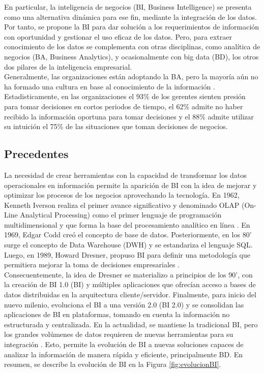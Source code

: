 \documentclass[12pt,jou]{apa7}
\begin{document}
En particular, la inteligencia de negocios (BI, Business Intelligence) se presenta como una alternativa dinámica para ese fin, mediante la integración de los datos. Por tanto, se propone la BI para dar solución a los requerimientos de información con oportunidad y gestionar el uso eficaz de los datos. Pero, para extraer conocimiento de los datos se complementa con otras disciplinas, como analítica de negocios (BA, Business Analytics), y ocasionalmente con big data (BD), los otros dos pilares de la inteligencia empresarial.\\

Generalmente, las organizaciones están adoptando la BA, pero la mayoría aún no ha formado una cultura en base al conocimiento de la información \cite{ThomasBean}. Estadisticamente, en las organizaciones el 93\% de los gerentes sienten presión para tomar decisiones en cortos periodos de tiempo, el 62\% admite no haber recibido la información oportuna para tomar decisiones y el 88\% admite utilizar su intuición el 75\% de las situaciones que toman decisiones de negocios.

\subsection{Precedentes}
La necesidad de crear herramientas con la capacidad de transformar los datos operacionales en información permite la aparición de BI con la idea de mejorar y optimizar los procesos de los negocios aprovechando la tecnología. En 1962, Kenneth Iverson realiza el primer avance significativo y denominado OLAP (On-Line Analytical Processing) como el primer lenguaje de programación multidimensional y que forma la base del procesamiento analítico en línea \cite{timem}. En 1969, Edgar Codd creó el concepto de base de datos. Posteriormente, en los 80' surge el concepto de Data Warehouse (DWH) y se estandariza el lenguaje SQL. Luego, en 1989, Howard Dresner, propuso BI para definir una metodología que permitiera mejorar la toma de decisiones empresariales \cite{direc}.\\

Consecuentemente, la idea de Dresner se materializo a principios de los 90', con la creación de BI 1.0 (BI) y múltiples aplicaciones que ofrecían acceso a bases de datos distribuidas en la arquitectura cliente/servidor. Finalmente, para inicio del nuevo milenio, evoluciona el BI  a una versión 2.0 (BI 2.0) y se consolidan las aplicaciones de BI en plataformas, tomando en cuenta la información no estructurada y centralizada. En la actualidad, se mantiene la tradicional BI, pero los grandes volúmenes de datos requieren de nuevas herramientas para su integración \cite{timem}. Esto, permite la evolución de BI a nuevas soluciones capaces de analizar la información de manera rápida y eficiente, principalmente BD. En resumen, se describe la evolución de BI en la Figura \ref{fig:evolucionBI}.
\end{document}

